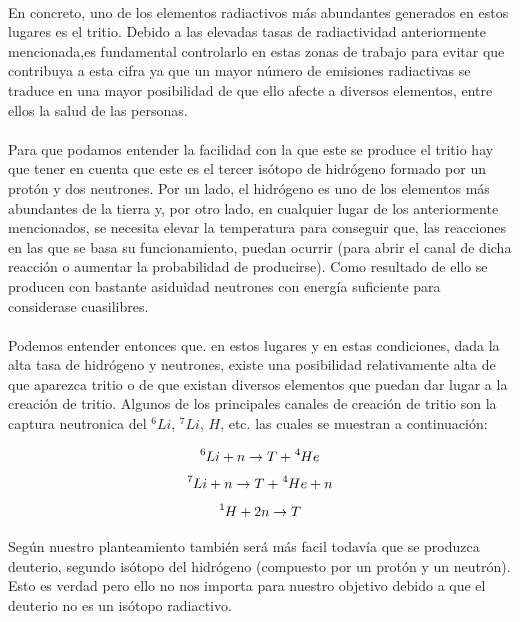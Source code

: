 \documentclass[11pt, a4paper]{article}
\begin{document}
\paragraph {}
En concreto, uno de los elementos radiactivos más abundantes generados en estos lugares es el tritio. Debido a las elevadas tasas de radiactividad anteriormente mencionada,es fundamental controlarlo en estas zonas de trabajo para evitar que contribuya a esta cifra ya que un mayor número de emisiones radiactivas se traduce en una mayor posibilidad de que ello afecte a diversos elementos, entre ellos la salud de las personas.

\paragraph {}
Para que podamos entender la facilidad con la que este se produce el tritio hay que tener en cuenta que este es el tercer isótopo de hidrógeno formado por un protón y dos neutrones. Por un lado, el hidrógeno es uno de los elementos más abundantes de la tierra y, por otro lado, en cualquier lugar de los anteriormente mencionados, se necesita elevar la temperatura para conseguir que, las reacciones en las que se basa su funcionamiento, puedan ocurrir (para abrir el canal de dicha reacción o aumentar la probabilidad de producirse). Como resultado de ello se producen con bastante asiduidad neutrones con energía suficiente para considerase cuasilibres. 

\paragraph {}
Podemos entender entonces que. en estos lugares y en estas condiciones, dada la alta tasa de hidrógeno y neutrones, existe una posibilidad relativamente alta de que aparezca tritio o de que existan diversos elementos que puedan dar lugar a la creación de tritio. Algunos de los principales canales de creación de tritio son la captura neutronica del $^6Li$, $^7Li$, $H$, etc. las cuales se muestran a continuación:

$$\ce{^{6}{Li}} + n \rightarrow T + \ce{^{4}{He}}$$
$$\ce{^{7}{Li}} + n \rightarrow T + \ce{^{4}{He}} + n$$
$$\ce{^{1}{H}} + 2n \rightarrow T $$

Según nuestro planteamiento también será más facil todavía que se produzca deuterio, segundo isótopo del hidrógeno (compuesto por un protón y un neutrón). Esto es verdad pero ello no nos importa para nuestro objetivo debido a que el deuterio no es un isótopo radiactivo.
\end{document}
